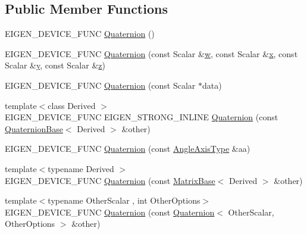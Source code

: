 \subsection*{Public Member Functions}
\begin{DoxyCompactItemize}
\item 
E\+I\+G\+E\+N\+\_\+\+D\+E\+V\+I\+C\+E\+\_\+\+F\+U\+NC \mbox{\hyperlink{class_eigen_1_1_quaternion_a7f8e93e2615e56344fd0d89c2916f9be}{Quaternion}} ()
\item 
E\+I\+G\+E\+N\+\_\+\+D\+E\+V\+I\+C\+E\+\_\+\+F\+U\+NC \mbox{\hyperlink{class_eigen_1_1_quaternion_a90c179492cd3ca296c85815e20773d60}{Quaternion}} (const Scalar \&\mbox{\hyperlink{class_eigen_1_1_quaternion_base_a6221021558ba509e7a5a7fc68092034d}{w}}, const Scalar \&\mbox{\hyperlink{class_eigen_1_1_quaternion_base_af5a6618608a86232397a60d11dbad13d}{x}}, const Scalar \&\mbox{\hyperlink{class_eigen_1_1_quaternion_base_a77a62575ed017e4086145714db4e6502}{y}}, const Scalar \&\mbox{\hyperlink{class_eigen_1_1_quaternion_base_af76afdeb1d1441cbf09d4989437a930e}{z}})
\item 
E\+I\+G\+E\+N\+\_\+\+D\+E\+V\+I\+C\+E\+\_\+\+F\+U\+NC \mbox{\hyperlink{class_eigen_1_1_quaternion_abb9e33e5d10806b5bc8b0683e94e8f72}{Quaternion}} (const Scalar $\ast$data)
\item 
{\footnotesize template$<$class Derived $>$ }\\E\+I\+G\+E\+N\+\_\+\+D\+E\+V\+I\+C\+E\+\_\+\+F\+U\+NC E\+I\+G\+E\+N\+\_\+\+S\+T\+R\+O\+N\+G\+\_\+\+I\+N\+L\+I\+NE \mbox{\hyperlink{class_eigen_1_1_quaternion_a272ce2dc4e30e6e0d68f455c7b1cc407}{Quaternion}} (const \mbox{\hyperlink{class_eigen_1_1_quaternion_base}{Quaternion\+Base}}$<$ Derived $>$ \&other)
\item 
E\+I\+G\+E\+N\+\_\+\+D\+E\+V\+I\+C\+E\+\_\+\+F\+U\+NC \mbox{\hyperlink{class_eigen_1_1_quaternion_a7ce40a727b6532e52d7d58d399328ce7}{Quaternion}} (const \mbox{\hyperlink{class_eigen_1_1_angle_axis}{Angle\+Axis\+Type}} \&aa)
\item 
{\footnotesize template$<$typename Derived $>$ }\\E\+I\+G\+E\+N\+\_\+\+D\+E\+V\+I\+C\+E\+\_\+\+F\+U\+NC \mbox{\hyperlink{class_eigen_1_1_quaternion_a3a7ed649b5c8c80ec7e78baf1ed0ba4c}{Quaternion}} (const \mbox{\hyperlink{class_eigen_1_1_matrix_base}{Matrix\+Base}}$<$ Derived $>$ \&other)
\item 
{\footnotesize template$<$typename Other\+Scalar , int Other\+Options$>$ }\\E\+I\+G\+E\+N\+\_\+\+D\+E\+V\+I\+C\+E\+\_\+\+F\+U\+NC \mbox{\hyperlink{class_eigen_1_1_quaternion_af6430466427b40d7ed79bfb6818cccc2}{Quaternion}} (const \mbox{\hyperlink{class_eigen_1_1_quaternion}{Quaternion}}$<$ Other\+Scalar, Other\+Options $>$ \&other)

\end{DoxyCompactItemize}
